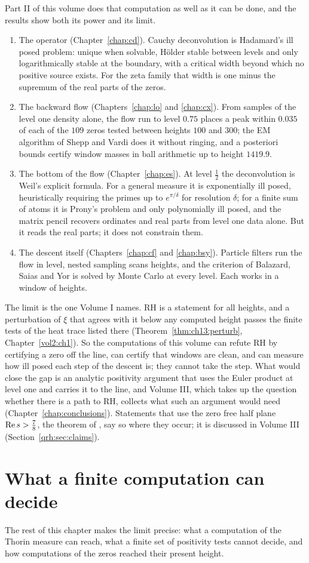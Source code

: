 Part II of this volume does that computation as well as it can be done, and the results show both its power and its limit.
\begin{enumerate}
\item The operator (Chapter~\ref{chap:cd}). Cauchy deconvolution is Hadamard's ill posed problem: unique when solvable, H\"older stable between levels and only logarithmically stable at the boundary, with a critical width beyond which no positive source exists. For the zeta family that width is one minus the supremum of the real parts of the zeros.
\item The backward flow (Chapters~\ref{chap:lo} and \ref{chap:cx}). From samples of the level one density alone, the flow run to level $0.75$ places a peak within $0.035$ of each of the $109$ zeros tested between heights $100$ and $300$; the EM algorithm of Shepp and Vardi does it without ringing, and a posteriori bounds certify window masses in ball arithmetic up to height $1419.9$.
\item The bottom of the flow (Chapter~\ref{chap:es}). At level $\frac12$ the deconvolution is Weil's explicit formula. For a general measure it is exponentially ill posed, heuristically requiring the primes up to $e^{\pi/\delta}$ for resolution $\delta$; for a finite sum of atoms it is Prony's problem and only polynomially ill posed, and the matrix pencil recovers ordinates and real parts from level one data alone. But it reads the real parts; it does not constrain them.
\item The descent itself (Chapters~\ref{chap:cf} and \ref{chap:bsy}). Particle filters run the flow in level, nested sampling scans heights, and the criterion of Balazard, Saias and Yor is solved by Monte Carlo at every level. Each works in a window of heights.
\end{enumerate}
The limit is the one Volume I names. RH is a statement for all heights, and a perturbation of $\xi$ that agrees with it below any computed height passes the finite tests of the heat trace listed there (Theorem~\ref{thm:ch13:perturb}, Chapter~\ref{vol2:ch1}). So the computations of this volume can refute RH by certifying a zero off the line, can certify that windows are clean, and can measure how ill posed each step of the descent is; they cannot take the step. What would close the gap is an analytic positivity argument that uses the Euler product at level one and carries it to the line, and Volume III, which takes up the question whether there is a path to RH, collects what such an argument would need (Chapter~\ref{chap:conclusions}). Statements that use the zero free half plane $\operatorname{Re} s>\frac78$, the theorem of \cite{OAI26a}, say so where they occur; it is discussed in Volume III (Section~\ref{qrh:sec:claims}).

\section{What a finite computation can decide}\label{ov2:sec:finite}

The rest of this chapter makes the limit precise: what a computation of the Thorin measure can reach, what a finite set of positivity tests cannot decide, and how computations of the zeros reached their present height.
